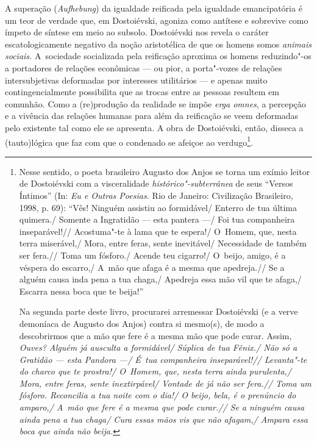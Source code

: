 A superação (\emph{Aufhebung}) da igualdade reificada pela igualdade
emancipatória é um teor de verdade que, em Dostoiévski, agoniza como
antítese e sobrevive como ímpeto de síntese em meio ao subsolo.
Dostoiévski nos revela o caráter escatologicamente negativo da noção
aristotélica de que os homens somos \emph{animais sociais.} A~sociedade
socializada pela reificação aproxima os homens reduzindo"-os a portadores
de relações econômicas --- ou pior, a porta"-vozes de relações
intersubjetivas deformadas por interesses utilitários --- e apenas muito
contingencialmente possibilita que as trocas entre as pessoas resultem
em comunhão. Como a (re)produção da realidade se impõe \emph{erga
omnes}, a percepção e a vivência das relações humanas para além da
reificação se veem deformadas pelo existente tal como ele se apresenta.
A obra de Dostoiévski, então, disseca a (tauto)lógica que faz com que o
condenado se afeiçoe ao verdugo\footnote{Nesse sentido, o poeta
  brasileiro Augusto dos Anjos se torna um exímio leitor de Dostoiévski
  com a visceralidade \emph{histórico"-subterrânea} de seus ``Versos
  Íntimos'' (In: \emph{Eu e Outras Poesias.} Rio de Janeiro: Civilização
  Brasileiro, 1998, p. 69): ``Vês! Ninguém assistiu ao formidável/
  Enterro de tua última quimera./ Somente a Ingratidão --- esta pantera
  ---/ Foi tua companheira inseparável!// Acostuma"-te à lama que te
  espera!/ O~Homem, que, nesta terra miserável,/ Mora, entre feras,
  sente inevitável/ Necessidade de também ser fera.// Toma um fósforo./ Acende teu cigarro!/ O~beijo, amigo, é a véspera do escarro,/ A~mão
  que afaga é a mesma que apedreja.// Se a alguém causa inda pena a tua
  chaga,/ Apedreja essa mão vil que te afaga,/ Escarra nessa boca que
  te beija!''

  Na segunda parte deste livro, procurarei arremessar Dostoiévski (e a
  verve demoníaca de Augusto dos Anjos) contra si mesmo(s), de modo a
  descobrirmos que a mão que fere é a mesma mão que pode curar. Assim,
  \emph{Ouves? Alguém já ausculta a formidável/ Súplica de tua Fênix./
  Não só a Gratidão --- esta Pandora ---/ É~tua companheira inseparável!//
  Levanta"-te do charco que te prostra!/ O~Homem, que, nesta terra ainda
  purulenta,/ Mora, entre feras, sente inextirpável/ Vontade de já não
  ser fera.// Toma um fósforo. Reconcilia a tua noite com o dia!/ O
  beijo, bela, é o prenúncio do amparo,/ A~mão que fere é a mesma que
  pode curar.// Se a ninguém causa ainda pena a tua chaga/ Cura essas
  mãos vis que não afagam,/ Ampara essa boca que ainda não beija. }}.

